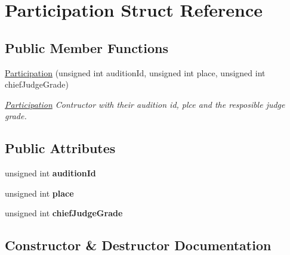 \hypertarget{struct_participation}{}\section{Participation Struct Reference}
\label{struct_participation}
\subsection*{Public Member Functions}
\begin{DoxyCompactItemize}
\item 
\hyperlink{struct_participation_a7007df223dc88b9bd9a43f0b9d46d4f4}{Participation} (unsigned int audition\+Id, unsigned int place, unsigned int chief\+Judge\+Grade)
\begin{DoxyCompactList}\small\item\em \hyperlink{struct_participation}{Participation} Contructor with their audition id, plce and the resposible judge grade. \end{DoxyCompactList}\end{DoxyCompactItemize}
\subsection*{Public Attributes}
\begin{DoxyCompactItemize}
\item 
\mbox{\label{struct_participation_a900734285691f5d86c7834a27c0665ab}} 
unsigned int {\bfseries audition\+Id}
\item 
\mbox{\label{struct_participation_a0444e02e0cb3e5f7a409f91823ef8fdf}} 
unsigned int {\bfseries place}
\item 
\mbox{\label{struct_participation_adaadb872a1828b5d57593d842b9cad24}} 
unsigned int {\bfseries chief\+Judge\+Grade}
\end{DoxyCompactItemize}


\subsection{Constructor \& Destructor Documentation}
\mbox{\label{struct_participation_a7007df223dc88b9bd9a43f0b9d46d4f4}} 
